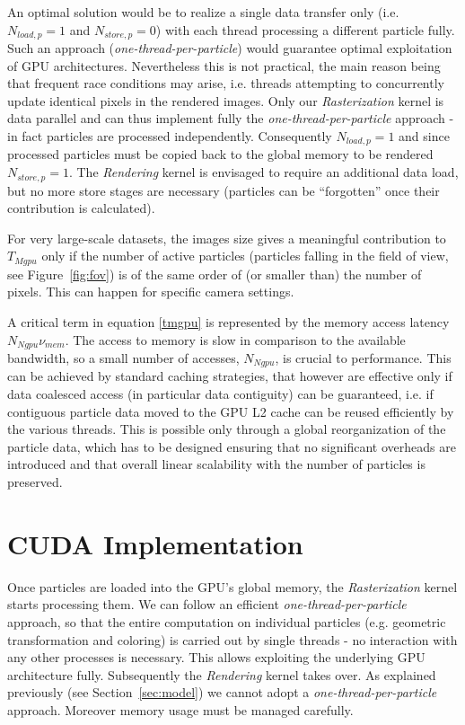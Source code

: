 \documentclass[1p]{elsarticle}
\begin{document}
An optimal solution would be to realize a single data transfer only
(i.e. $N_{load,p} = 1$ and $N_{store,p} = 0$) with each thread processing a different particle fully. Such an approach ({\it one-thread-per-particle}) would guarantee optimal exploitation of GPU architectures. Nevertheless this is not practical, the main reason being that frequent race conditions may arise, i.e. threads attempting to concurrently update identical pixels in the rendered images.
Only our {\it Rasterization} kernel is data parallel and can thus implement fully the {\it one-thread-per-particle} approach - in fact particles are processed independently. Consequently $N_{load,p} = 1$ and since processed particles must be copied back to the global memory to be rendered $N_{store,p} = 1$. The {\it Rendering} kernel is envisaged to require an additional data load, but no more store 
stages are necessary (particles can be ``forgotten'' once their contribution is calculated).

For very large-scale datasets, the images size gives a meaningful contribution to $T_{Mgpu}$ only if the number of active particles (particles falling in the field of view, see Figure~\ref{fig:fov}) is of the same order of (or smaller than) the number of pixels. This can happen for specific camera settings.

A critical term in equation \eqref{tmgpu} is represented by the memory access
latency $N_{Ngpu} \nu_{mem}$. The access to memory is slow in comparison to
the available bandwidth, so a small number of accesses, $N_{Ngpu}$, is crucial
to performance. This can be achieved by standard caching strategies, that
however are effective only if data coalesced access (in particular data contiguity) can be guaranteed, i.e. if contiguous particle data moved to the GPU L2 cache can be reused efficiently
by the various threads. This is possible only through a global reorganization 
of the particle data, which has to be designed ensuring that no significant overheads are introduced and  
that overall linear scalability with the number of particles is preserved.

\section{CUDA Implementation}
\label{sec:implementation}

Once particles are loaded into the GPU's global memory, the {\it Rasterization} kernel starts processing them. We can follow an efficient {\it one-thread-per-particle} approach, so that the entire computation on individual particles (e.g. geometric transformation and coloring) is carried out by single threads - no interaction with any other processes is necessary. This allows exploiting the underlying GPU architecture fully. Subsequently the {\it Rendering} kernel takes over. As explained previously (see Section~\ref{sec:model}) we cannot adopt a {\it one-thread-per-particle} approach. Moreover memory usage must be managed carefully.
\end{document}
